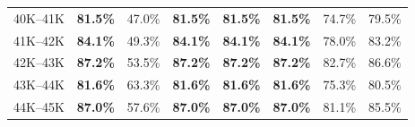 \begin{table}[h]
\begin{tabular}{lrrrrrrr}
40K--41K & \textbf{81.5\%} & 47.0\% & \textbf{81.5\%} & \textbf{81.5\%} & \textbf{81.5\%} & 74.7\% & 79.5\% \\
41K--42K & \textbf{84.1\%} & 49.3\% & \textbf{84.1\%} & \textbf{84.1\%} & \textbf{84.1\%} & 78.0\% & 83.2\% \\
42K--43K & \textbf{87.2\%} & 53.5\% & \textbf{87.2\%} & \textbf{87.2\%} & \textbf{87.2\%} & 82.7\% & 86.6\% \\
43K--44K & \textbf{81.6\%} & 63.3\% & \textbf{81.6\%} & \textbf{81.6\%} & \textbf{81.6\%} & 75.3\% & 80.5\% \\
44K--45K & \textbf{87.0\%} & 57.6\% & \textbf{87.0\%} & \textbf{87.0\%} & \textbf{87.0\%} & 81.1\% & 85.5\% \\
\bottomrule
\end{tabular}
\end{table}
